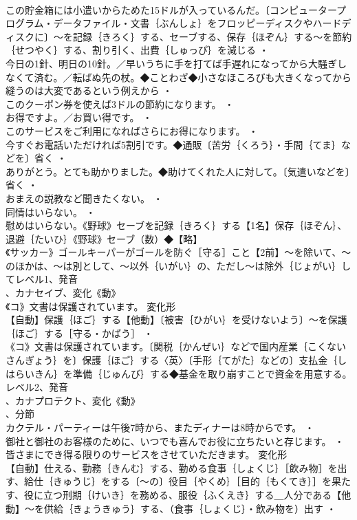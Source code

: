 \documentclass[8pt]{extreport}
\begin{document}
\begin{CJK}{UTF8}{min}
\\	この貯金箱には小遣いからためた15ドルが入っているんだ。〔コンピュータープログラム・データファイル・文書｛ぶんしょ｝をフロッピーディスクやハードディスクに〕～を記録｛きろく｝する、セーブする、保存｛ほぞん｝する～を節約｛せつやく｝する、割り引く、出費｛しゅっぴ｝を減じる ・
\\	今日の1針、明日の10針。／早いうちに手を打てば手遅れになってから大騒ぎしなくて済む。／転ばぬ先の杖。◆ことわざ◆小さなほころびも大きくなってから縫うのは大変であるという例えから ・
\\	このクーポン券を使えば3ドルの節約になります。 ・
\\	お得ですよ。／お買い得です。 ・
\\	このサービスをご利用になればさらにお得になります。 ・
\\	今すぐお電話いただければ5割引です。◆通販〔苦労｛くろう｝・手間｛てま｝などを〕省く ・
\\	ありがとう。とても助かりました。◆助けてくれた人に対して。〔気遣いなどを〕省く ・
\\	おまえの説教など聞きたくない。 ・
\\	同情はいらない。 ・
\\	慰めはいらない。《野球》セーブを記録｛きろく｝する【1名】保存｛ほぞん｝、退避｛たいひ｝《野球》セーブ（数）◆【略】
\\	《サッカー》ゴールキーパーがゴールを防ぐ［守る］こと【2前】～を除いて、～のほかは、～は別として、～以外｛いがい｝の、ただし～は除外｛じょがい｝してレベル1、発音
\\	、カナセイブ、変化《動》
\\	《コ》文書は保護されています。	変化形 
\\	【自動】保護｛ほご｝する【他動】〔被害｛ひがい｝を受けないよう〕～を保護｛ほご｝する［守る・かばう］ ・
\\	《コ》文書は保護されています。〔関税｛かんぜい｝などで国内産業｛こくない さんぎょう｝を〕保護｛ほご｝する〈英〉〔手形｛てがた｝などの〕支払金｛しはらいきん｝を準備｛じゅんび｝する◆基金を取り崩すことで資金を用意する。レベル2、発音
\\	、カナプロテクト、変化《動》
\\	、分節
\\	カクテル・パーティーは午後7時から、またディナーは8時からです。 ・
\\	御社と御社のお客様のために、いつでも喜んでお役に立ちたいと存じます。 ・
\\	皆さまにでき得る限りのサービスをさせていただきます。	変化形 
\\	【自動】仕える、勤務｛きんむ｝する、勤める食事｛しょくじ｝［飲み物］を出す、給仕｛きゅうじ｝をする〔～の〕役目｛やくめ｝［目的｛もくてき｝］を果たす、役に立つ刑期｛けいき｝を務める、服役｛ふくえき｝する＿人分である【他動】～を供給｛きょうきゅう｝する、（食事｛しょくじ｝・飲み物を）出す ・

\end{CJK}
\end{document}

